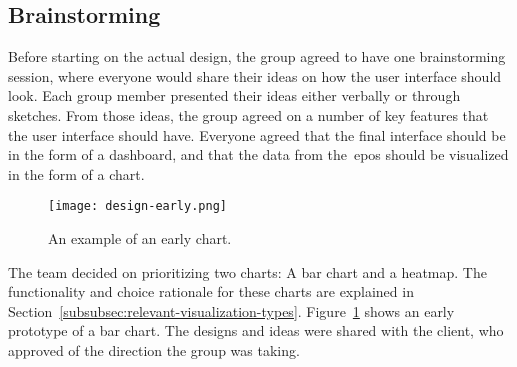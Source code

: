 \subsection{Brainstorming}\label{subsec:brainstorming}

Before starting on the actual design, the group agreed to have one brainstorming session, where everyone would share
their ideas on how the user interface should look.
Each group member presented their ideas either verbally or through sketches.
From those ideas, the group agreed on a number of key features that the user interface should have.
Everyone agreed that the final interface should be in the form of a dashboard, and that the data from
the~\acrshort{epos} should be visualized in the form of a chart.

\begin{figure}[H]
    \centering
    \texttt{[image: design-early.png]}
    \caption{An example of an early chart.
    }\label{fig:design-early}
\end{figure}

The team decided on prioritizing two charts: A bar chart and a heatmap.
The functionality and choice rationale for these charts are explained in
Section~\ref{subsubsec:relevant-visualization-types}.
Figure~\ref{fig:design-early} shows an early prototype of a bar chart.
The designs and ideas were shared with the client, who approved of the direction the group was taking.
